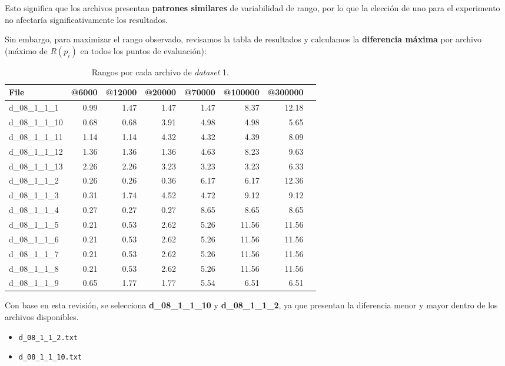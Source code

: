 \begin{itemize}
        Esto significa que los archivos presentan \textbf{patrones similares} de variabilidad de rango, por lo que la elección de uno para el experimento no afectaría significativamente los resultados.
        
        Sin embargo, para maximizar el rango observado, revisamos la tabla de resultados y calculamos la \textbf{diferencia máxima} por archivo (máximo de $R(p_i)$ en todos los puntos de evaluación):
        
        \begin{table}[H]
        \centering
        \begin{tabular}{lrrrrrrr}
        \hline
        \textbf{File} & @6000 & @12000 & @20000 & @70000 & @100000 & @300000  \\
        \hline
        d\_08\_1\_1\_1  & 0.99 & 1.47 & 1.47 & 1.47 & 8.37 & 12.18  \\
        d\_08\_1\_1\_10 & 0.68 & 0.68 & 3.91 & 4.98 & 4.98 & 5.65   \\
        d\_08\_1\_1\_11 & 1.14 & 1.14 & 4.32 & 4.32 & 4.39 & 8.09  \\
        d\_08\_1\_1\_12 & 1.36 & 1.36 & 1.36 & 4.63 & 8.23 & 9.63   \\
        d\_08\_1\_1\_13 & 2.26 & 2.26 & 3.23 & 3.23 & 3.23 & 6.33   \\
        d\_08\_1\_1\_2  & 0.26 & 0.26 & 0.36 & 6.17 & 6.17 & 12.36  \\
        d\_08\_1\_1\_3  & 0.31 & 1.74 & 4.52 & 4.72 & 9.12 & 9.12   \\
        d\_08\_1\_1\_4  & 0.27 & 0.27 & 0.27 & 8.65 & 8.65 & 8.65    \\
        d\_08\_1\_1\_5  & 0.21 & 0.53 & 2.62 & 5.26 & 11.56 & 11.56 \\
        d\_08\_1\_1\_6  & 0.21 & 0.53 & 2.62 & 5.26 & 11.56 & 11.56  \\
        d\_08\_1\_1\_7  & 0.21 & 0.53 & 2.62 & 5.26 & 11.56 & 11.56  \\
        d\_08\_1\_1\_8  & 0.21 & 0.53 & 2.62 & 5.26 & 11.56 & 11.56 \\
        d\_08\_1\_1\_9  & 0.65 & 1.77 & 1.77 & 5.54 & 6.51 & 6.51 \\
        \hline
        \end{tabular}
        \caption{Rangos por cada archivo de \textit{dataset} 1.}
        \end{table}
        
        Con base en esta revisión, se selecciona \textbf{d\_08\_1\_1\_10} y \textbf{d\_08\_1\_1\_2}, ya que presentan la diferencia menor y mayor dentro de los archivos disponibles.
        \begin{itemize}
            \item \texttt{d\_08\_1\_1\_2.txt}
            \item \texttt{d\_08\_1\_1\_10.txt}
        \end{itemize}
    

\end{itemize}

